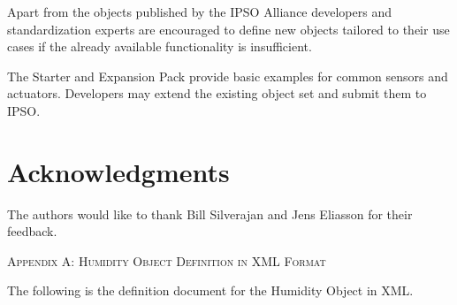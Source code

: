 \documentclass[peerreview, a4paper, 7pt]{IEEEtran}
\begin{document}
Apart from the objects published by the IPSO Alliance developers and standardization experts are encouraged to define new objects tailored to their use cases if the already available functionality is insufficient. %

The Starter and Expansion Pack provide basic examples for common sensors and actuators. Developers may extend the existing object set and submit them to IPSO. %

\section{Acknowledgments}
The authors would like to thank Bill Silverajan and Jens Eliasson for their feedback.


% 



\appendix
\label{appendix_a}

\textsc{Appendix A: Humidity Object Definition in XML Format}

The following is the definition document for the Humidity Object in XML.
\end{document}
